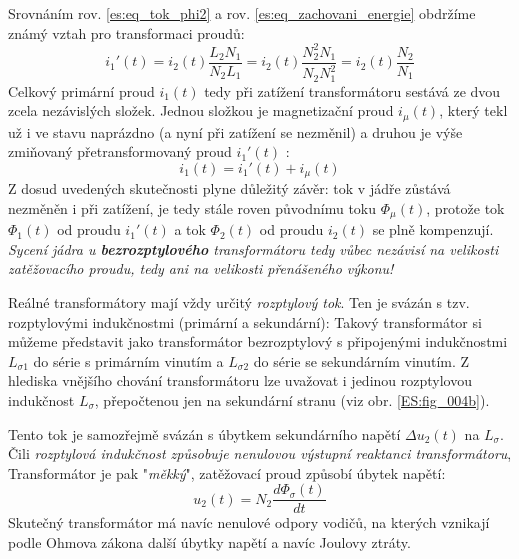       Srovnáním rov. \ref{es:eq_tok_phi2} a rov. \ref{es:eq_zachovani_energie} obdržíme známý vztah
      pro transformaci proudů:
      \begin{equation}\label{es:eq_i1_cark}
        i_1'(t)=i_2(t)\frac{L_2N_1}{N_2L_1}=i_2 (t)\frac{N_2^2N_1}{N_2N_1^2}=i_2(t)\frac{N_2}{N_1}
      \end{equation}
      Celkový primární proud $i_1(t)$ tedy při zatížení transformátoru sestává ze dvou zcela 
      nezávislých složek. Jednou složkou je magnetizační proud $i_\mu(t)$, který tekl už i ve stavu 
      naprázdno (a nyní při zatížení se nezměnil) a druhou je výše zmiňovaný přetransformovaný 
      proud $i_1'(t)$ :
      \begin{equation}\label{es:eq_i1_sum}
        i_1(t)=i_1'(t)+i_\mu(t)
      \end{equation}
      Z dosud uvedených skutečnosti plyne důležitý závěr: tok v jádře zůstává nezměněn i při 
      zatížení, je tedy stále roven původnímu toku $\Phi_\mu(t)$, protože tok $\Phi_1(t)$ od proudu 
      $i_1'(t)$ a tok $\Phi_2(t)$ od proudu $i_2(t)$ se plně kompenzují. \emph{Sycení jádra u 
      \textbf{bezrozptylového} transformátoru tedy vůbec nezávisí na velikosti zatěžovacího 
      prou\-du, tedy ani na velikosti přenášeného výkonu!}

      Reálné transformátory mají vždy určitý \emph{rozptylový tok}. Ten je svázán s tzv.      
      roz\-pty\-lo\-vý\-mi indukčnostmi (primární a sekundární): Takový transformátor si můžeme 
      představit jako transformátor bezrozptylový s připojen\-ými indukčnostmi $L_{\sigma1}$ do 
      série s pri\-már\-ním vinutím a $L_{\sigma2}$ do série se sekundár\-ním vinutím. Z hlediska 
      vnějšího chování transformátoru lze uvažovat i jedinou rozptylovou indukčnost $L_\sigma$, 
      přepočtenou jen na sekundární stranu (viz obr. \ref{ES:fig_004b}).

      Tento tok je samozřejmě svázán s úbytkem sekundárního napětí $\Delta u_2(t)$ na $L_\sigma$.
      Čili \emph{rozptylová indukčnost způsobuje nenulovou výstupní reaktanci transformátoru},
      Transformátor je pak "\emph{měkký}", zatěžovací proud způsobí úbytek napětí:
      \begin{equation}\label{es:eq_ubytek_Lsigma}
        u_2(t)=N_2\frac{d\Phi_\sigma(t)}{dt}
      \end{equation}
      Skutečný transformátor má navíc nenulové odpory vodičů, na kterých vznikají podle Ohmova
      zákona další úbytky napětí a navíc Joulovy ztráty.

